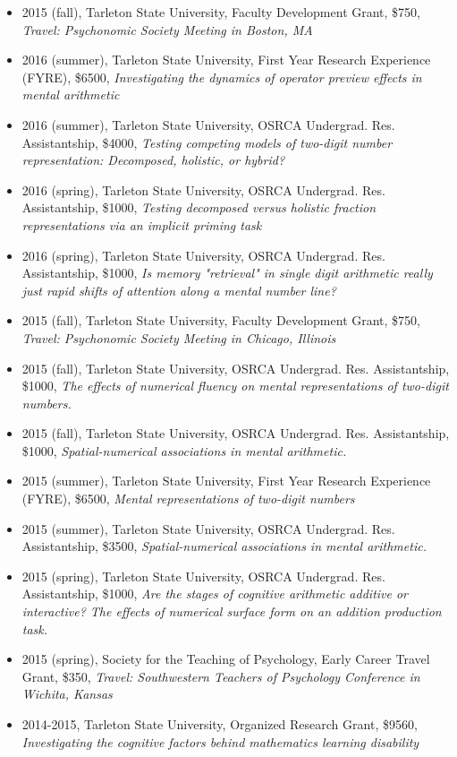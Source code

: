 \documentclass[article,10pt]{article}
\begin{document}
\begin{itemize}
\item 2015 (fall), Tarleton State University, Faculty Development Grant, \$750, \emph{Travel: Psychonomic Society Meeting in Boston, MA}
\item 2016 (summer), Tarleton State University, First Year Research Experience (FYRE), \$6500, \emph{Investigating the dynamics of operator preview effects in mental arithmetic}
\item 2016 (summer), Tarleton State University, OSRCA Undergrad. Res. Assistantship, \$4000, \emph{Testing competing models of two-digit number representation: Decomposed, holistic, or hybrid?}
\item 2016 (spring), Tarleton State University, OSRCA Undergrad. Res. Assistantship, \$1000, \emph{Testing decomposed versus holistic fraction representations via an implicit priming task}
\item 2016 (spring), Tarleton State University, OSRCA Undergrad. Res. Assistantship, \$1000, \emph{Is memory "retrieval" in single digit arithmetic really just rapid shifts of attention along a mental number line?}
\item 2015 (fall), Tarleton State University, Faculty Development Grant, \$750, \emph{Travel: Psychonomic Society Meeting in Chicago, Illinois}
\item 2015 (fall), Tarleton State University, OSRCA Undergrad. Res. Assistantship, \$1000, \emph{The effects of numerical fluency on mental representations of two-digit numbers.}
\item 2015 (fall), Tarleton State University, OSRCA Undergrad. Res. Assistantship, \$1000, \emph{Spatial-numerical associations in mental arithmetic.}
\item 2015 (summer), Tarleton State University, First Year Research Experience (FYRE), \$6500, \emph{Mental representations of two-digit numbers}
\item 2015 (summer), Tarleton State University, OSRCA Undergrad. Res. Assistantship, \$3500, \emph{Spatial-numerical associations in mental arithmetic.}
\item 2015 (spring), Tarleton State University, OSRCA Undergrad. Res. Assistantship, \$1000, \emph{Are the stages of cognitive arithmetic additive or interactive? The effects of numerical surface form on an addition production task.}
\item 2015 (spring), Society for the Teaching of Psychology, Early Career Travel Grant, \$350, \emph{Travel: Southwestern Teachers of Psychology Conference in Wichita, Kansas}
\item 2014-2015, Tarleton State University, Organized Research Grant, \$9560, \emph{Investigating the cognitive factors behind mathematics learning disability}

\end{itemize}
\end{document}
